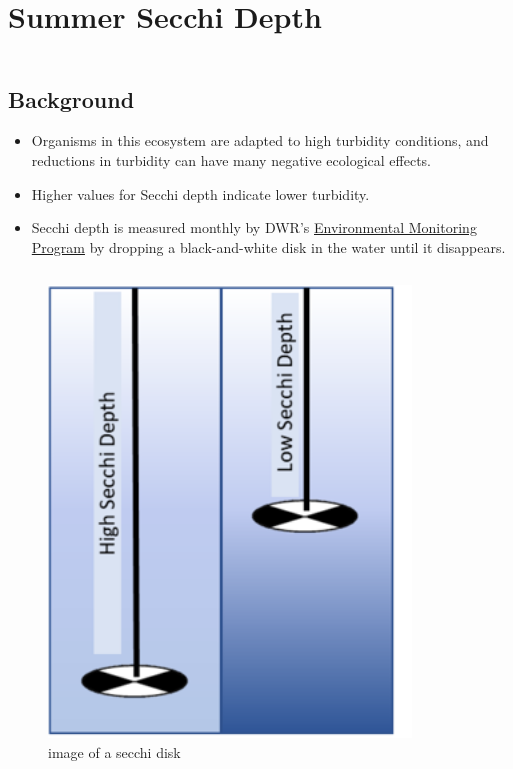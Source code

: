 \documentclass[
]{book}
\providecommand{\tightlist}{%
  \setlength{\itemsep}{0pt}\setlength{\parskip}{0pt}}
\begin{document}
\hypertarget{summer-secchi-depth}{%
\section{Summer Secchi Depth}\label{summer-secchi-depth}}

\begin{columns-nocenter}

\begin{column}

\hypertarget{background}{%
\subsection{Background}\label{background}}

\begin{itemize}
\tightlist
\item
  Organisms in this ecosystem are adapted to high turbidity conditions, and reductions in turbidity can have many negative ecological effects.
\item
  Higher values for Secchi depth indicate lower turbidity.
\item
  Secchi depth is measured monthly by DWR's \href{https://emp.baydeltalive.com/wiki/12297}{Environmental Monitoring Program} by dropping a black-and-white disk in the water until it disappears.
\end{itemize}

\end{column}

\begin{column}

\begin{figure}

{\centering \includegraphics[width=3.79in]{figures/secchidisc} 

}

\caption{image of a secchi disk}\label{fig:unnamed-chunk-49}
\end{figure}

\end{column}

\end{columns-nocenter}
\end{document}
